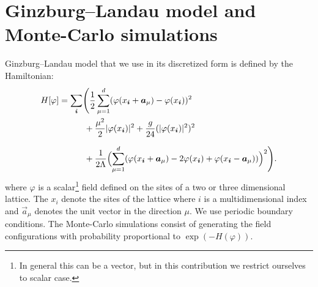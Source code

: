 \documentclass[a4paper]{llncs}
\renewcommand{\a}[1]{\v{a}_{#1}}
\renewcommand{\v}[1]{\vec{#1}}
\newcommand{\vphi}{\varphi}
\newcommand{\vi}{{\vec{i}}}
\begin{document}
\section{Ginzburg--Landau model and Monte-Carlo simulations}

Ginzburg--Landau model that we use in its discretized form is defined by the
Hamiltonian\cite{parisi}:
\begin{equation*}\label{eq:hamiltonian}\begin{split}
H[\varphi]&=\sum_{\vi}\Biggl(
\frac{1}{2}\sum_{\mu=1}^d(\vphi(x_\vi+\a{\mu})-\vphi(x_\vi))^2\\
&\phantom{=\sum_{\vi}\bigl(}+\frac{\mu^2}{2}|\vphi(x_{\vi})|^2+
\frac{g}{24}(|\vphi(x_{\vi})|^2)^2\\
&\phantom{=\sum_{\vi}\bigl(}+
\frac{1}{2\Lambda}\Bigl(\sum_{\mu=1}^d
(\vphi(x_\vi+\a{\mu})-2\vphi(x_{\vi})+\vphi(x_\vi-\a\mu))\Bigr)^2\Biggr).
\end{split}
\end{equation*}
where $\vphi$ is a scalar\footnote{In general this can be a vector,
  but in this contribution we restrict ourselves to scalar case.} field
defined on the sites of a two or three dimensional lattice. The $x_i$
denote the sites of the lattice where $i$ is a multidimensional index
and $\a\mu$ denotes the unit vector in the direction $\mu$. We use
periodic boundary conditions.  The Monte-Carlo simulations consist of
generating the field configurations with probability proportional to
$\exp(-H(\vphi))$.
\end{document}
